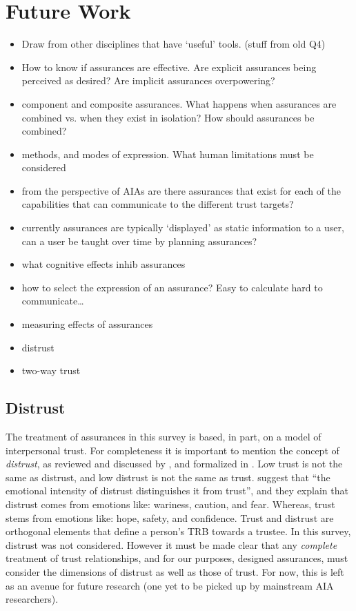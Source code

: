 \section{Future Work} \label{sec:future_work}

\begin{itemize}
    \item Draw from other disciplines that have `useful' tools. (stuff from old Q4)
    \item How to know if assurances are effective. Are explicit assurances being perceived as desired? Are implicit assurances overpowering?
    \item component and composite assurances. What happens when assurances are combined vs. when they exist in isolation? How should assurances be combined?
    \item methods, and modes of expression. What human limitations must be considered
    \item from the perspective of AIAs are there assurances that exist for each of the capabilities that can communicate to the different trust targets?
    \item currently assurances are typically `displayed' as static information to a user, can a user be taught over time by planning assurances?
    \item what cognitive effects inhib assurances
    \item how to select the expression of an assurance? Easy to calculate hard to communicate\ldots
    \item measuring effects of assurances
    \item distrust
    \item two-way trust
\end{itemize}






\subsection{Distrust}
The treatment of assurances in this survey is based, in part, on a model of interpersonal trust. For completeness it is important to mention the concept of \textit{distrust}, as reviewed and discussed by \citet{Lewicki1998-ox}, and formalized in \citet{McKnight2001-gz}. Low trust is not the same as distrust, and low distrust is not the same as trust. \citet{McKnight2001-gz} suggest that ``the emotional intensity of distrust distinguishes it from trust'', and they explain that distrust comes from emotions like: wariness, caution, and fear. Whereas, trust stems from emotions like: hope, safety, and confidence. Trust and distrust are orthogonal elements that define a person's TRB towards a trustee. In this survey, distrust was not considered. However it must be made clear that any \emph{complete} treatment of trust relationships, and for our purposes, designed assurances, must consider the dimensions of distrust as well as those of trust. For now, this is left as an avenue for future research (one yet to be picked up by mainstream AIA researchers).




